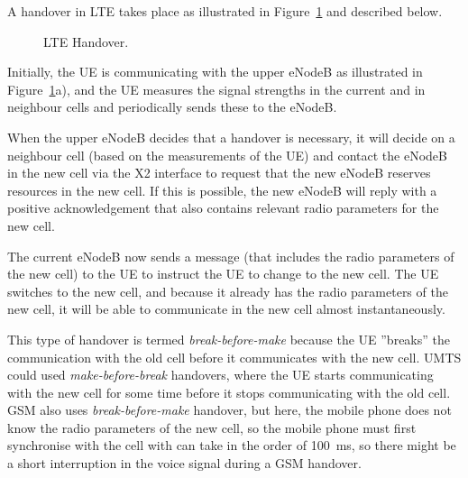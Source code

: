 A handover in LTE takes place as illustrated in Figure~\ref{fig:LTE-HO} and described below.
\begin{figure}[htbp]
\centering
\begin{subfigure}[t]{\textwidth}
\centering{}
\caption{}
\end{subfigure}
\begin{subfigure}[t]{\textwidth}
\centering{}
\caption{}
\end{subfigure}
\begin{subfigure}[t]{\textwidth}
\centering{}
\caption{}
\end{subfigure}
\caption{\label{fig:LTE-HO}LTE Handover.}
\end{figure}

Initially, the UE is communicating with the upper eNodeB as illustrated in Figure~\ref{fig:LTE-HO}a), and the UE measures the signal strengths in the current and in neighbour cells and periodically sends these to the eNodeB.

When the upper eNodeB decides that a handover is necessary, it will decide on a neighbour cell (based on the measurements of the UE) and contact the eNodeB in the new cell via the X2 interface to request that the new eNodeB reserves resources in the new cell. If this is possible, the new eNodeB will reply with a positive acknowledgement that also contains relevant radio parameters for the new cell.

The current eNodeB now sends a message (that includes the radio parameters of the new cell) to the UE to instruct the UE to change to the new cell. The UE  switches to the new cell, and because it already has the radio parameters of the new cell, it will be able to communicate in the new cell almost instantaneously.

This type of handover is termed \emph{break-before-make} because the UE ''breaks'' the communication with the old cell before it communicates with the new cell. UMTS could used \emph{make-before-break} handovers, where the UE starts communicating with the new cell for some time before it stops communicating with the old cell. GSM also uses \emph{break-before-make} handover, but here, the mobile phone does not know the radio parameters of the new cell, so the mobile phone must first synchronise with the cell with can take in the order of 100~ms, so there might be a short interruption in the voice signal during a GSM handover.

